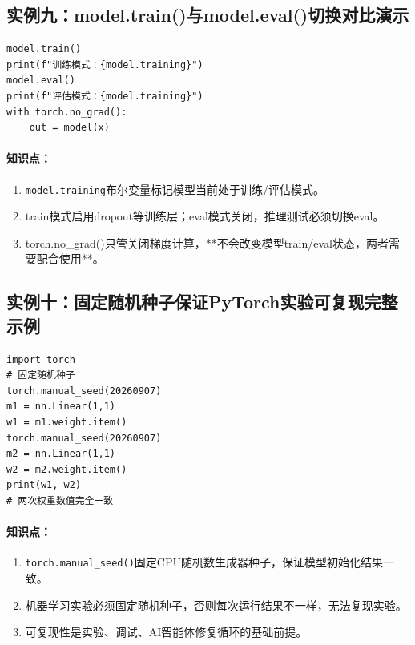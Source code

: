 \documentclass{article}
\begin{document}
\subsection*{实例九：model.train()与model.eval()切换对比演示}
\begin{lstlisting}
model.train()
print(f"训练模式：{model.training}")
model.eval()
print(f"评估模式：{model.training}")
with torch.no_grad():
    out = model(x)
\end{lstlisting}
\paragraph{知识点：}
\begin{enumerate}
\item \texttt{model.training}布尔变量标记模型当前处于训练/评估模式。
\item train模式启用dropout等训练层；eval模式关闭，推理测试必须切换eval。
\item torch.no\_grad()只管关闭梯度计算，**不会改变模型train/eval状态，两者需要配合使用**。
\end{enumerate}
\subsection*{实例十：固定随机种子保证PyTorch实验可复现完整示例}
\begin{lstlisting}
import torch
# 固定随机种子
torch.manual_seed(20260907)
m1 = nn.Linear(1,1)
w1 = m1.weight.item()
torch.manual_seed(20260907)
m2 = nn.Linear(1,1)
w2 = m2.weight.item()
print(w1, w2)
# 两次权重数值完全一致
\end{lstlisting}
\paragraph{知识点：}
\begin{enumerate}
\item \texttt{torch.manual\_seed()}固定CPU随机数生成器种子，保证模型初始化结果一致。
\item 机器学习实验必须固定随机种子，否则每次运行结果不一样，无法复现实验。
\item 可复现性是实验、调试、AI智能体修复循环的基础前提。
\end{enumerate}
\end{document}
